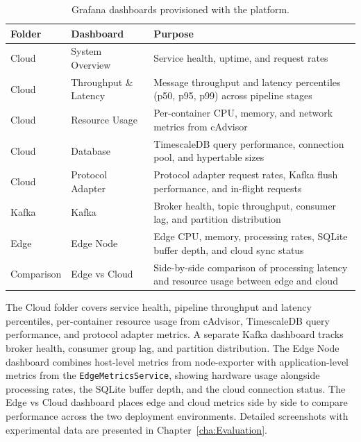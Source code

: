 \begin{table}[htbp]
    \centering
    \caption{Grafana dashboards provisioned with the platform.}
    \label{tab:grafana-dashboards}
    \begin{tabular}{l l p{6.5cm}}
        \hline
        \textbf{Folder} & \textbf{Dashboard}    & \textbf{Purpose}                                                                        \\
        \hline
        Cloud           & System Overview       & Service health, uptime, and request rates                                               \\
        Cloud           & Throughput \& Latency & Message throughput and latency percentiles (p50, p95, p99) across pipeline stages       \\
        Cloud           & Resource Usage        & Per-container \gls{CPU}, memory, and network metrics from cAdvisor                      \\
        Cloud           & Database              & TimescaleDB query performance, connection pool, and hypertable sizes                    \\
        Cloud           & Protocol Adapter      & Protocol adapter request rates, Kafka flush performance, and in-flight requests         \\
        Kafka           & Kafka                 & Broker health, topic throughput, consumer lag, and partition distribution               \\
        Edge            & Edge Node             & Edge \gls{CPU}, memory, processing rates, SQLite buffer depth, and cloud sync status    \\
        Comparison      & Edge vs Cloud         & Side-by-side comparison of processing latency and resource usage between edge and cloud \\
        \hline
    \end{tabular}
\end{table}

The Cloud folder covers service health, pipeline throughput and latency percentiles, per-container resource usage from cAdvisor, TimescaleDB query performance, and protocol adapter metrics. A separate Kafka dashboard tracks broker health, consumer group lag, and partition distribution. The Edge Node dashboard combines host-level metrics from node-exporter with application-level metrics from the \texttt{EdgeMetricsService}, showing hardware usage alongside processing rates, the SQLite buffer depth, and the cloud connection status. The Edge vs Cloud dashboard places edge and cloud metrics side by side to compare performance across the two deployment environments. Detailed screenshots with experimental data are presented in Chapter~\ref{cha:Evaluation}.
